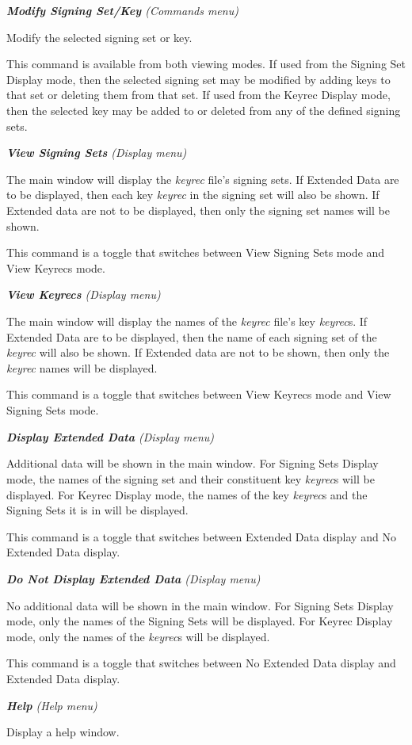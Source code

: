 \begin{description}
\item {\it {\bf Modify Signing Set/Key} (Commands menu)}\verb" "

Modify the selected signing set or key.

This command is available from both viewing modes.  If used from the Signing
Set Display mode, then the selected signing set may be modified by adding keys
to that set or deleting them from that set.  If used from the Keyrec Display
mode, then the selected key may be added to or deleted from any of the defined
signing sets.

\item {\it {\bf View Signing Sets} (Display menu)}\verb" "

The main window will display the {\it keyrec} file's signing sets.  If
Extended Data are to be displayed, then each key {\it keyrec} in the signing
set will also be shown.  If Extended data are not to be displayed, then only
the signing set names will be shown.

This command is a toggle that switches between View Signing Sets mode and
View Keyrecs mode.

\item {\it {\bf View Keyrecs} (Display menu)}\verb" "

The main window will display the names of the {\it keyrec} file's key {\it
keyrec}s.  If Extended Data are to be displayed, then the name of each signing
set of the {\it keyrec} will also be shown.  If Extended data are not to be
shown, then only the {\it keyrec} names will be displayed.

This command is a toggle that switches between View Keyrecs mode and View
Signing Sets mode.

\item {\it {\bf Display Extended Data} (Display menu)}\verb" "

Additional data will be shown in the main window.  For Signing Sets Display
mode, the names of the signing set and their constituent key {\it keyrec}s will
be displayed.  For Keyrec Display mode, the names of the key {\it keyrec}s and
the Signing Sets it is in will be displayed.

This command is a toggle that switches between Extended Data display and
No Extended Data display.

\item {\it {\bf Do Not Display Extended Data} (Display menu)}\verb" "

No additional data will be shown in the main window.  For Signing Sets Display
mode, only the names of the Signing Sets will be displayed.  For Keyrec Display
mode, only the names of the {\it keyrec}s will be displayed.

This command is a toggle that switches between No Extended Data display and
Extended Data display.

\item {\it {\bf Help} (Help menu)}\verb" "

Display a help window.

\end{description}

